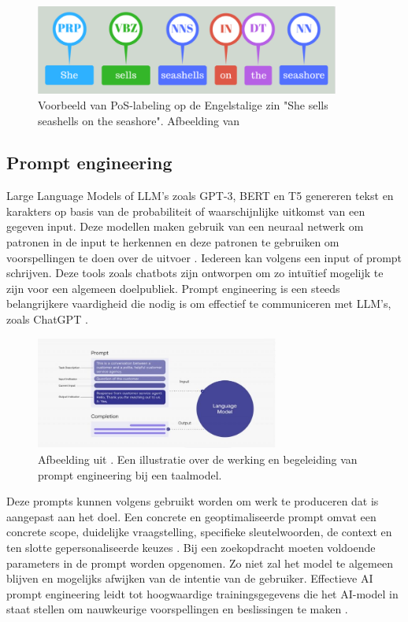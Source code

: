 \begin{figure}[H]
	\begin{center}
		\includegraphics[width=10cm]{img/poslabeling.png}
	\end{center}
	\caption{Voorbeeld van PoS-labeling op de Engelstalige zin "She sells seashells on the seashore". Afbeelding van \textcite{Bilisci2021} }
	\label{fig:pos}
\end{figure}

\subsection{Prompt engineering}
Large Language Models of LLM's zoals GPT-3, BERT en T5 genereren tekst en karakters op basis van de probabiliteit of waarschijnlijke uitkomst van een gegeven input. Deze modellen maken gebruik van een neuraal netwerk om patronen in de input te herkennen en deze patronen te gebruiken om voorspellingen te doen over de uitvoer \autocite{Liu2020}. Iedereen kan volgens \textcite{McFarland2023} een input of prompt schrijven. Deze tools zoals chatbots zijn ontworpen om zo intuïtief mogelijk te zijn voor een algemeen doelpubliek. Prompt engineering is een steeds belangrijkere vaardigheid die nodig is om effectief te communiceren met LLM’s, zoals ChatGPT \autocite{Harwell2023}.

\begin{figure}
	\begin{center}
			\includegraphics[width=8cm]{img/prompt-engineering-medium.png}
	\end{center}
	\caption{Afbeelding uit \textcite{McFarland2023}. Een illustratie over de werking en begeleiding van prompt engineering bij een taalmodel. }
\end{figure}

Deze prompts kunnen volgens \textcite{Liu2020} gebruikt worden om werk te produceren dat is aangepast aan het doel. Een concrete en geoptimaliseerde prompt omvat een concrete scope, duidelijke vraagstelling, specifieke sleutelwoorden, de context en ten slotte gepersonaliseerde keuzes \autocite{McFarland2023}. Bij een zoekopdracht moeten voldoende parameters in de prompt worden opgenomen. Zo niet zal het model te algemeen blijven en mogelijks afwijken van de intentie van de gebruiker. Effectieve AI prompt engineering leidt tot hoogwaardige trainingsgegevens die het AI-model in staat stellen om nauwkeurige voorspellingen en beslissingen te maken \autocite{Liu2020}. 

